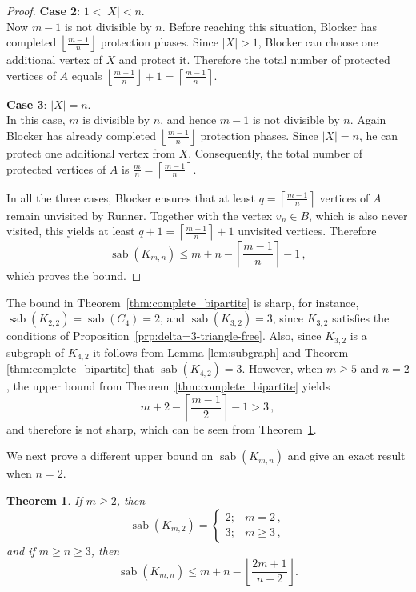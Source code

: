 \documentclass[10pt,a4paper]{amsart}
\newtheorem{theorem}{Theorem}[section]
\DeclareMathOperator{\sab}{\mathrm{sab}}
\begin{document}
\begin{proof}
\medskip\noindent
{\bf Case 2}: $1<|X|<n$. \\
Now $m-1$ is not divisible by $n$. Before reaching this situation, Blocker has completed $\left\lfloor\frac{m-1}{n}\right\rfloor$
protection phases. Since $|X|>1$, Blocker can choose one additional vertex of $X$ and protect it. Therefore the total number of protected vertices of $A$ equals $\left\lfloor\frac{m-1}{n}\right\rfloor+1=\left\lceil\frac{m-1}{n}\right\rceil$.

\medskip\noindent
{\bf Case 3}: $|X|=n$. \\
In this case, $m$ is divisible by $n$, and hence $m-1$ is not divisible by $n$. Again Blocker has already completed $\left\lfloor\frac{m-1}{n}\right\rfloor$ protection phases. Since $|X|=n$, he can protect one additional vertex from $X$. Consequently, the total number of protected vertices of $A$ is $\frac{m}{n}=\left\lceil\frac{m-1}{n}\right\rceil$.

\medskip

In all the three cases, Blocker ensures that at least $q=\left\lceil\frac{m-1}{n}\right\rceil$ vertices of $A$ remain unvisited by Runner. Together with the vertex $v_n\in B$, which is also never visited, this yields at least $q+1=\left\lceil\frac{m-1}{n}\right\rceil+1$ unvisited vertices. Therefore
$$\sab(K_{m,n}) \le m+n-\left\lceil\frac{m-1}{n}\right\rceil-1\,,$$
which proves the bound.
\end{proof}

The bound in Theorem~\ref{thm:complete_bipartite} is sharp, for instance, $\sab(K_{2,2})=\sab(C_4)=2$, and $\sab(K_{3,2})=3$, since $K_{3,2}$ satisfies the conditions of Proposition~\ref{prp:delta=3-triangle-free}. 
Also, since $K_{3,2}$ is a subgraph of $K_{4,2}$ it follows from Lemma \ref{lem:subgraph} and Theorem \ref{thm:complete_bipartite} that $\sab(K_{4,2})=3$. However, when $m \ge 5$ and $n=2$, the upper bound from Theorem~\ref{thm:complete_bipartite} yields
$$m+2-\left\lceil \frac{m-1}{2} \right\rceil - 1 > 3\,,$$ and therefore is not sharp, which can be seen from Theorem~\ref{thm:complete_bipartite_new}. 

We next prove a different upper bound on $\sab(K_{m,n})$ and give an exact result when $n=2$. 


\begin{theorem}
\label{thm:complete_bipartite_new}
If $m \ge 2$, then
$$\sab(K_{m,2}) =  
\begin{cases}
2; & m=2\,,\\[5pt]
3; & m \ge 3\,,
\end{cases}$$
and if  $m \geq n \ge 3$, then
$$\sab(K_{m,n}) \leq m+n-\left\lfloor \frac{2m+1}{n+2} \right\rfloor .$$
\end{theorem}
\end{document}
